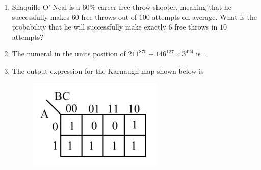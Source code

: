 \documentclass[journal,12pt,onecolumn]{IEEEtran}
\theoremstyle{remark}
\begin{document}
\begin{enumerate}[start=1, label=Q.\arabic*]
    \hfill{}

    \item Shaquille O' Neal is a $60\%$ career free throw shooter, meaning that he successfully makes $60$ free throws out of $100$ attempts on average. What is the probability that he will successfully make exactly $6$ free throws in $10$ attempts?
    \begin{enumerate}
    \end{enumerate}

    \hfill{}

    \item The numeral in the units position of $211^{870} + 146^{127} \times 3^{424}$ is \underline{\hspace{2cm}}.

    \hfill{}

    \item The output expression for the Karnaugh map shown below is
    \begin{figure}[H]
        \includegraphics[width=0.4\columnwidth]{Figures/2q1.png}
        \centering
        \caption{}
    \end{figure}
    \begin{enumerate}
    \end{enumerate}


\end{enumerate}
\end{document}
